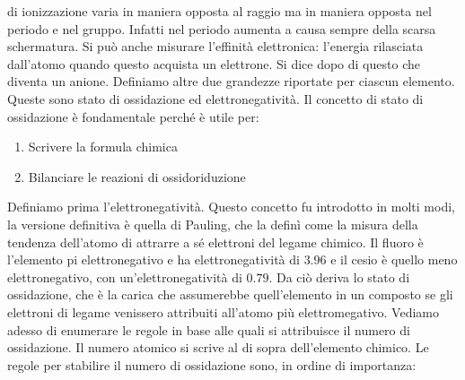 \documentclass[../AppuntiChimica]{subfiles}
\begin{document}
di ionizzazione varia in maniera opposta al raggio ma in maniera opposta nel periodo e nel gruppo. Infatti nel periodo aumenta a causa sempre della scarsa schermatura. Si può anche misurare l'effinità elettronica: l'energia rilasciata dall'atomo quando questo acquista un elettrone. Si dice dopo di questo che diventa un anione. Definiamo altre due grandezze riportate per ciascun elemento. Queste sono stato di ossidazione ed elettronegatività. Il concetto di stato di ossidazione è fondamentale perché è utile per:
		\begin{enumerate}
			\item Scrivere la formula chimica 
			\item Bilanciare le reazioni di ossidoriduzione
		\end{enumerate}
	Definiamo prima l'elettronegatività. Questo concetto fu introdotto in molti modi, la versione definitiva è quella di Pauling, che la definì come la misura della tendenza dell'atomo di attrarre a sé elettroni del legame chimico. Il fluoro è l'elemento pi elettronegativo e ha elettronegatività di $ 3.96 $ e il cesio è quello meno elettronegativo, con un'elettronegatività di $ 0.79 $. Da ciò deriva lo stato di ossidazione, che è la carica che assumerebbe quell'elemento in un composto se gli elettroni di legame venissero attribuiti all'atomo più elettromegativo. Vediamo adesso di enumerare le regole in base alle quali si attribuisce il numero di ossidazione. Il numero atomico si scrive al di sopra dell'elemento chimico. Le regole per stabilire il numero di ossidazione sono, in ordine di importanza:
	 
\end{document}
